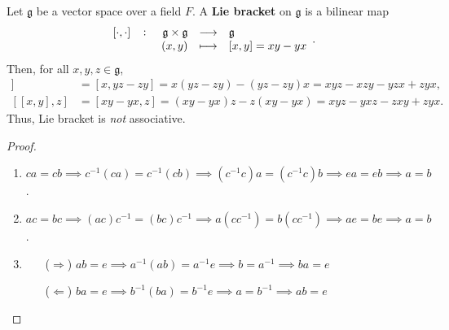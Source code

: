 \documentclass[11pt,openany]{article}
\begin{document}
\vspace{20pt}
\begin{example}
Let $\mathfrak{g}$ be a vector space over a field $F$. A \textbf{Lie bracket} on $\mathfrak{g}$ is a bilinear map \[
\fullfunction{[\cdot,\cdot]}{\mathfrak{g}\times\mathfrak{g}}{\mathfrak{g}}{(x,y)}{[x,y]=xy-yx}.
\] Then, for all $x,y,z\in\mathfrak{g}$, \begin{align*}
[x,[y,z]]&=[x,yz-zy]=x(yz-zy)-(yz-zy)x=xyz-xzy-yzx+zyx,\\
[[x,y],z]&=[xy-yx,z]=(xy-yx)z-z(xy-yx)=xyz-yxz-zxy+zyx.
\end{align*} Thus, Lie bracket is \textit{not} associative.
\end{example}

\newpage
{}
\begin{proof}
\begin{enumerate}[(1)]
	\item $ca=cb\implies c^{-1}(ca)=c^{-1}(cb)\implies(c^{-1}c)a=(c^{-1}c)b\implies ea=eb\implies a=b$.
	\item $ac=bc\implies (ac)c^{-1}=(bc)c^{-1}\implies a(cc^{-1})=b(cc^{-1})\implies ae=be\implies a=b$.
	\item \begin{itemize}
		\item[($\Rightarrow$)] $ab=e\implies a^{-1}(ab)=a^{-1}e\implies b=a^{-1}\implies ba=e$
		\item[($\Leftarrow$)] $ba=e\implies b^{-1}(ba)=b^{-1}e\implies a=b^{-1}\implies ab=e$
	\end{itemize}
\end{enumerate}
\end{proof}
\vspace{40pt}
\end{document}
